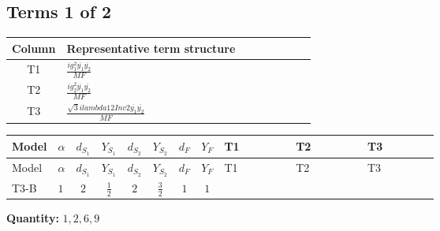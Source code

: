 \documentclass[8pt]{article}
\begin{document}
\begin{landscape}
\subsection*{Terms 1 of 2}
\begin{center}
\begin{tabular}{@{}c >{\raggedright\arraybackslash}p{0.82\linewidth}@{}}
\toprule
Column & Representative term structure \\
\midrule
T1 & \(\displaystyle \frac{i g_{1}^{2} \overline{y_{1}} \overline{y_{2}}}{MF}\) \\
\midrule
T2 & \(\displaystyle \frac{i g_{2}^{2} \overline{y_{1}} \overline{y_{2}}}{MF}\) \\
\midrule
T3 & \(\displaystyle \frac{\sqrt{3} i lambda12Inv2 \overline{y_{1}} \overline{y_{2}}}{MF}\) \\
\midrule
\bottomrule
\end{tabular}
\end{center}
\smallskip
\tiny
\begin{longtable}{@{}llcccccc >{\raggedright\arraybackslash}p{0.21\linewidth} >{\raggedright\arraybackslash}p{0.21\linewidth} >{\raggedright\arraybackslash}p{0.21\linewidth}@{}}
\toprule
Model & $\alpha$ & $d_{S_1}$ & $Y_{S_1}$ & $d_{S_2}$ & $Y_{S_2}$ & $d_F$ & $Y_F$ & T1 & T2 & T3 \\
\midrule
\endfirsthead
\toprule
Model & $\alpha$ & $d_{S_1}$ & $Y_{S_1}$ & $d_{S_2}$ & $Y_{S_2}$ & $d_F$ & $Y_F$ & T1 & T2 & T3 \\
\midrule
\endhead
T3-B & $1$ & $2$ & $\frac{1}{2}$ & $2$ & $\frac{3}{2}$ & $1$ & $1$ & \scriptsize\adjustbox{max width=\linewidth}{$\begin{gathered} - \frac{3 i g_{1}^{2} \overline{y_{1}} \overline{y_{2}}}{4 MF}\end{gathered}$} & \scriptsize\adjustbox{max width=\linewidth}{$\begin{gathered} - \frac{3 i g_{2}^{2} \overline{y_{1}} \overline{y_{2}}}{8 MF}\end{gathered}$} & \scriptsize\adjustbox{max width=\linewidth}{$\begin{gathered} - \frac{\sqrt{3} i lambda12Inv2 \overline{y_{1}} \overline{y_{2}}}{6 MF}\end{gathered}$} \\
\midrule
\bottomrule
\end{longtable}
\clearpage
\noindent\textbf{Quantity: }$\mathrm{1,2,6,9}$\par\smallskip

\end{landscape}
\end{document}
